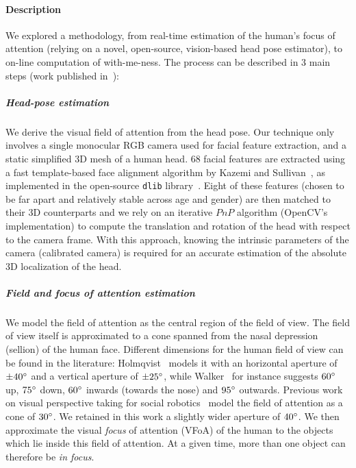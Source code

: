 \documentclass[10pt,a4paper]{article}
\begin{document}
\paragraph{Description}
We explored a methodology, from real-time
estimation of the human's focus of attention (relying on a novel, open-source,
vision-based head pose estimator), to on-line computation of with-me-ness. The process can be described in 3 main steps (work published in~\cite{lemaignan2016realtime}):

\subparagraph{Head-pose estimation}
We derive the visual field of attention from the head pose. Our
technique only involves a single monocular RGB camera used for facial feature
extraction, and a static simplified 3D mesh of a human head.  68 facial features
are extracted using a fast template-based face alignment algorithm by Kazemi and
Sullivan~\cite{kazemi2014one}, as implemented in the open-source {\tt dlib}
library~\cite{dlib09}.  Eight of these features (chosen to be far apart and
relatively stable across age and gender) are then matched to their 3D
counterparts and we rely on an iterative $PnP$
algorithm (OpenCV's implementation) to compute the translation and rotation of
the head with respect to the camera frame. With this approach, knowing the
intrinsic parameters of the camera (calibrated camera) is required for an
accurate estimation of the absolute 3D localization of the head.

\subparagraph{Field and focus of attention estimation}
We model the field of attention as the central region of the field of view.  The
field of view itself is approximated to a cone spanned from the nasal depression
(sellion) of the human face. Different dimensions for the human field of view
can be found in the literature: Holmqvist~\cite{holmqvist2011eye} models it
with an horizontal aperture of $ \pm 40\degree $ and a vertical aperture of $
\pm 25\degree $, while Walker~\cite{walker1980clinical} for instance suggests
$60\degree$ up, $75\degree$ down, $60\degree$ inwards (towards the nose) and
$95\degree$ outwards.  Previous work on visual perspective taking for social
robotics~\cite{sisbot2011situation} model the field of attention as a cone of
$30\degree$. We retained in this work a slightly wider aperture of $40\degree$.
We then approximate the visual \emph{focus} of attention (VFoA) of the human to
the objects which lie inside this field of attention. At
a given time, more than one object can therefore be \emph{in focus}.
\end{document}

